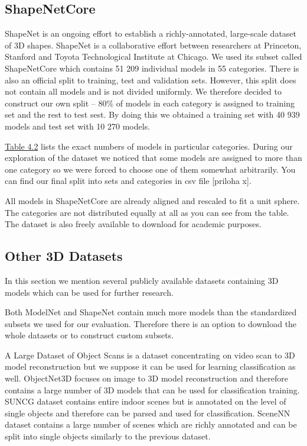 \subsection{ShapeNetCore}
ShapeNet \cite{chang_shapenet:_2015} is an ongoing effort to establish a richly-annotated, large-scale dataset of 3D shapes. ShapeNet is a collaborative effort between researchers at Princeton, Stanford and Toyota Technological Institute at Chicago. We used its subset called ShapeNetCore which contains 51 209 individual models in 55 categories. There is also an official split to training, test and validation sets. However, this split does not contain all models and is not divided uniformly. We therefore decided to construct our own split -- 80\% of models in each category is assigned to training set and the rest to test sest. By doing this we obtained a training set with 40 939 models and test set with 10 270 models. \par \hyperref[Table:shapenetcats]{Table 4.2} lists the exact numbers of models in particular categories. During our exploration of the dataset we noticed that some models are assigned to more than one category so we were forced to choose one of them somewhat arbitrarily. You can find our final split into sets and categories in csv file [priloha x].  \par
All models in ShapeNetCore are already aligned and rescaled to fit a unit sphere. The categories are not distributed equally at all as you can see from the table. The dataset is also freely available to download for academic purposes.




\subsection{Other 3D Datasets}
In this section we mention several publicly available datasets containing 3D models which can be used for further research. \par
Both ModelNet and ShapeNet contain much more models than the standardized subsets we used for our evaluation. Therefore there is an option to download the whole datasets or to construct custom subsets. \par
A Large Dataset of Object Scans \cite{choi_large_2016} is a dataset concentrating on video scan to 3D model reconstruction but we suppose it can be used for learning classification as well. 
ObjectNet3D \cite{xiang_objectnet3d:_2016} focuses on image to 3D model reconstruction and therefore contains a large number of 3D models that can be used for classification training.
SUNCG dataset \cite{song_semantic_2017} contains entire indoor scenes but is annotated on the level of single objects and therefore can be parsed and used for classification. 
SceneNN \cite{hua_scenenn:_2016} dataset contains a large number of scenes which are richly annotated and can be split into single objects similarly to the previous dataset.

